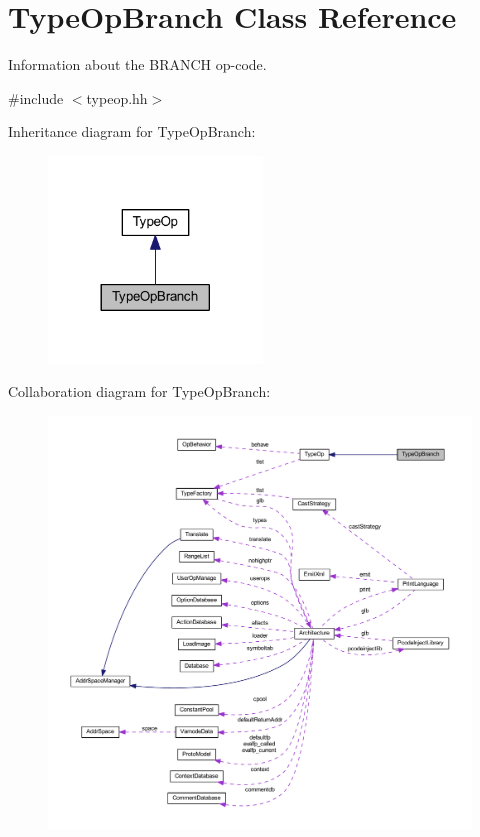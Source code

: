 \hypertarget{class_type_op_branch}{}\section{Type\+Op\+Branch Class Reference}
\label{class_type_op_branch}


Information about the B\+R\+A\+N\+CH op-\/code.  




{\ttfamily \#include $<$typeop.\+hh$>$}



Inheritance diagram for Type\+Op\+Branch\+:
\nopagebreak
\begin{figure}[H]
\begin{center}
\leavevmode
\includegraphics[width=161pt]{class_type_op_branch__inherit__graph}
\end{center}
\end{figure}


Collaboration diagram for Type\+Op\+Branch\+:
\nopagebreak
\begin{figure}[H]
\begin{center}
\leavevmode
\includegraphics[width=350pt]{class_type_op_branch__coll__graph}
\end{center}
\end{figure}
